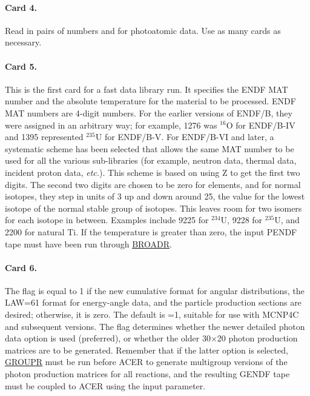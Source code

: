 \paragraph{Card 4.}
Read in  pairs of numbers  and  for
photoatomic data.  Use as many cards as necessary.

\paragraph{Card 5.}
This is the first card for a fast data library run.  It specifies the
ENDF MAT number and the absolute temperature for the material to be
processed.   ENDF MAT numbers are 4-digit numbers.  For the earlier
versions of ENDF/B, they were assigned in an arbitrary way; for example,
1276 was $^{16}$O for ENDF/B-IV and 1395 represented $^{235}$U for ENDF/B-V.
For ENDF/B-VI and later, a systematic scheme has been selected that allows the
same MAT number to be used for all the various sub-libraries (for example,
neutron data, thermal data, incident proton data, {\it etc.}).  This
scheme is based on using Z to get the first two digits.  The second two
digits are chosen to be zero for elements, and for normal isotopes, they
step in units of 3 up and down around 25, the value for the lowest
isotope of the normal stable group of isotopes.  This leaves room for
two isomers for each isotope in between.  Examples include 9225 for
$^{234}$U, 9228 for $^{235}$U, and 2200 for natural Ti. If the
temperature is greater than zero, the input PENDF tape must have
been run through \hyperlink{sBROADRhy}{BROADR}.

\paragraph{Card 6.}
The flag  is equal to 1 if the new cumulative
format for angular distributions, the LAW=61 format for energy-angle
data, and the particle production sections are desired; otherwise, it
is zero.  The default is =1, suitable for use with MCNP4C
and subsequent versions.  The flag  determines whether the
newer detailed photon data option is used (preferred), or whether the
older 30$\times$20 photon production matrices are to be generated.
Remember that if the latter option is selected,
\hyperlink{sGROUPRhy}{GROUPR} must be run
before ACER to generate multigroup versions of the photon production
matrices for all reactions, and the resulting GENDF tape must be
coupled to ACER using the  input parameter.

